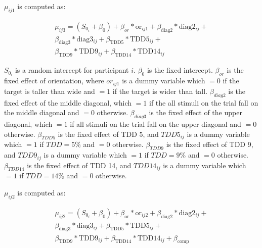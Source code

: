 $\mu_{ij1}$ is computed as:

\begin{equation}
    \begin{aligned}
        \mu_{ij3}=(S_{0_i} + \beta_{0}) + \beta_{or}*\mathrm{or}_{ij1} + \beta_{\mathrm{diag}2}*\mathrm{diag}2_{ij}+ \\
        \beta_{\mathrm{diag}3}*\mathrm{diag}3_{ij} + \beta_{\mathrm{TDD}5}*\mathrm{TDD}5_{ij} +\\ \beta_{\mathrm{TDD}9}*\mathrm{TDD}9_{ij} + \beta_{\mathrm{TDD}14}*\mathrm{TDD}14_{ij}
        \label{circle_mu_eqn1}
    \end{aligned}
\end{equation}

$S_{0_i}$ is a random intercept for participant $i$. $\beta_{0}$ is the fixed intercept. $\beta_{or}$ is the fixed effect of orientation, where $or_{ij1}$ is a dummy variable which $=0$ if the target is taller than wide and $=1$ if the target is wider than tall. $\beta_{diag2}$ is the fixed effect of the middle diagonal, which $=1$ if the all stimuli on the trial fall on the middle diagonal and $=0$ otherwise. $\beta_{diag3}$ is the fixed effect of the upper diagonal, which $=1$ if all stimuli on the trial fall on the upper diagonal and $=0$ otherwise. $\beta_{TDD5}$ is the fixed effect of TDD 5, and $TDD5_{ij}$ is a dummy variable which $=1$ if $TDD=5\%$ and $=0$ otherwise. $\beta_{TDD9}$ is the fixed effect of TDD 9, and $TDD9_{ij}$ is a dummy variable which $=1$ if $TDD=9\%$ and $=0$ otherwise. $\beta_{TDD14}$ is the fixed effect of TDD 14, and $TDD14_{ij}$ is a dummy variable which $=1$ if $TDD=14\%$ and $=0$ otherwise. 

$\mu_{ij2}$ is computed as:

\begin{equation}
    \begin{aligned}
        \mu_{ij2}=(S_{0_i} + \beta_{0}) + \beta_{\mathrm{or}}*\mathrm{or}_{ij2} + \beta_{\mathrm{diag}2}*\mathrm{diag}2_{ij}+ \\\beta_{\mathrm{diag}3}*\mathrm{diag}3_{ij} + \beta_{\mathrm{TDD}5}*\mathrm{TDD}5_{ij} + \\\beta_{\mathrm{TDD}9}*\mathrm{TDD}9_{ij} + \beta_{\mathrm{TDD}14}*\mathrm{TDD}14_{ij} + \beta_{\mathrm{comp}}
        \label{circle_mu_eqn2}
    \end{aligned}
\end{equation}

